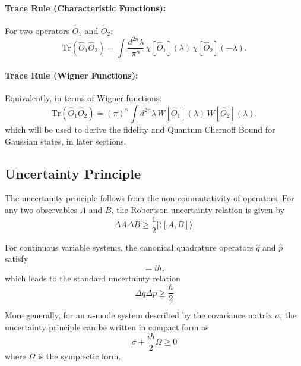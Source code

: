 \paragraph{Trace Rule (Characteristic Functions):}
For two operators $\hat{O}_1$ and $\hat{O}_2$:
\begin{equation}
\mathrm{Tr}(\hat{O}_1 \hat{O}_2)
= \int \frac{d^{2n}\lambda}{\pi^n} \,
\chi[\hat{O}_1](\lambda)\, \chi[\hat{O}_2](-\lambda).
\end{equation}

\paragraph{Trace Rule (Wigner Functions):}
Equivalently, in terms of Wigner functions:
\begin{equation}
\mathrm{Tr}(\hat{O}_1 \hat{O}_2)
= (\pi)^n \int d^{2n}\lambda \,
W[\hat{O}_1](\lambda)\, W[\hat{O}_2](\lambda).
\end{equation}
which will be used to derive the fidelity and Quantum Chernoff Bound for Gaussian states, in later sections.





\subsection{Uncertainty Principle}

The uncertainty principle follows from the non-commutativity of operators. For any two observables $A$ and $B$, the Robertson uncertainty relation is given by
\begin{equation}
\Delta A \Delta B \geq \frac{1}{2} \left| \langle [A,B] \rangle \right|
\end{equation}

For continuous variable systems, the canonical quadrature operators $\hat{q}$ and $\hat{p}$ satisfy
\begin{equation}
[\hat{q}, \hat{p}] = i\hbar,
\end{equation}
which leads to the standard uncertainty relation
\begin{equation}
\Delta q  \Delta p \geq \frac{\hbar}{2}
\end{equation}

More generally, for an $n$-mode system described by the covariance matrix $\sigma$, the uncertainty principle can be written in compact form \cite{simon1994quantum} as
\begin{equation}
\sigma + \frac{i\hbar}{2}\Omega \geq 0
\end{equation}
where $\Omega$ is the symplectic form.






